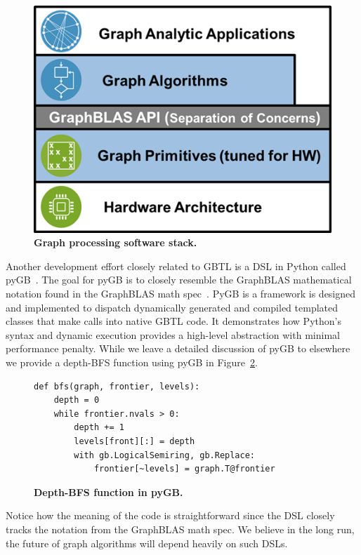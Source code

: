 \begin{figure}[t]
\includegraphics[width=\linewidth]{fig/gbtl}
\caption{\textbf{Graph processing software stack.}\label{fig:gbtl}}
\end{figure}


Another development effort closely related to GBTL is a DSL in Python called pyGB~\cite{Chamberlin2016}.  
The goal for pyGB is to closely resemble the GraphBLAS mathematical notation found in the GraphBLAS math spec~\cite{mathgraphblas16}.  
PyGB is a framework is designed and implemented to dispatch dynamically generated and compiled templated 
classes that make calls into native GBTL code.  It demonstrates how Python's syntax and dynamic execution provides 
a high-level abstraction with minimal performance penalty.  While we leave a detailed discussion of pyGB to elsewhere~\cite{Chamberlin2016}
we provide a depth-BFS function using pyGB in Figure~\ref{code:pyGB}.
%
\begin{figure}[t]
{\small
\begin{verbatim}
def bfs(graph, frontier, levels):
    depth = 0
    while frontier.nvals > 0:
        depth += 1
        levels[front][:] = depth
        with gb.LogicalSemiring, gb.Replace:
            frontier[~levels] = graph.T@frontier
\end{verbatim}
}
\caption{\textbf{Depth-BFS function in pyGB.}\label{code:pyGB}}
\end{figure}
%
%
%
Notice how the meaning of the code
is straightforward since the DSL closely tracks the notation from the GraphBLAS math spec.  We believe in the long run, the 
future of graph algorithms will depend heavily on such DSLs.

